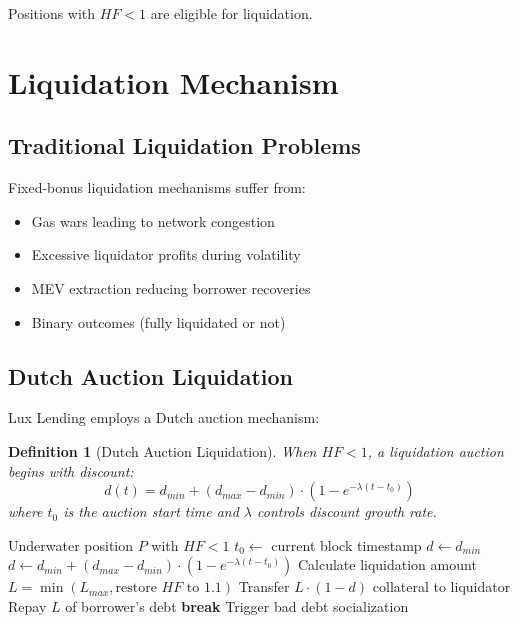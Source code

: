 \documentclass[11pt,a4paper]{article}
\newtheorem{definition}[theorem]{Definition}
\begin{document}
Positions with $HF < 1$ are eligible for liquidation.

\section{Liquidation Mechanism}

\subsection{Traditional Liquidation Problems}

Fixed-bonus liquidation mechanisms suffer from:
\begin{itemize}
    \item Gas wars leading to network congestion
    \item Excessive liquidator profits during volatility
    \item MEV extraction reducing borrower recoveries
    \item Binary outcomes (fully liquidated or not)
\end{itemize}

\subsection{Dutch Auction Liquidation}

Lux Lending employs a Dutch auction mechanism:

\begin{definition}[Dutch Auction Liquidation]
When $HF < 1$, a liquidation auction begins with discount:
\begin{equation}
    d(t) = d_{min} + (d_{max} - d_{min}) \cdot \left(1 - e^{-\lambda(t - t_0)}\right)
\end{equation}
where $t_0$ is the auction start time and $\lambda$ controls discount growth rate.
\end{definition}

\begin{algorithm}
\caption{Dutch Auction Liquidation}
\begin{algorithmic}[1]
\Require Underwater position $P$ with $HF < 1$
\State $t_0 \gets$ current block timestamp
\State $d \gets d_{min}$
    \State $d \gets d_{min} + (d_{max} - d_{min}) \cdot (1 - e^{-\lambda(t - t_0)})$
        \State Calculate liquidation amount $L = \min(L_{max}, \text{restore } HF \text{ to } 1.1)$
        \State Transfer $L \cdot (1 - d)$ collateral to liquidator
        \State Repay $L$ of borrower's debt
        \State \textbf{break}
    \EndIf
\EndWhile
{}
    \State Trigger bad debt socialization
\EndIf
\end{algorithmic}
\end{algorithm}
\end{document}
